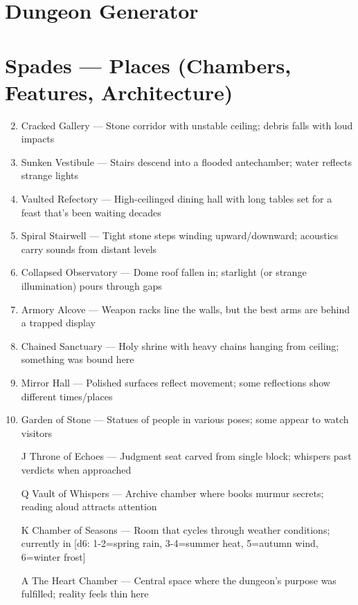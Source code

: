 \section{Dungeon Generator}
\label{chap:dungeon-generator}

\section*{Spades --- Places (Chambers, Features, Architecture)}
\label{sec:dungeon-places}
\begin{enumerate}
\setcounter{enumi}{1}
\item Cracked Gallery --- Stone corridor with unstable ceiling; debris falls with loud impacts
\item Sunken Vestibule --- Stairs descend into a flooded antechamber; water reflects strange lights
\item Vaulted Refectory --- High-ceilinged dining hall with long tables set for a feast that's been waiting decades
\item Spiral Stairwell --- Tight stone steps winding upward/downward; acoustics carry sounds from distant levels
\item Collapsed Observatory --- Dome roof fallen in; starlight (or strange illumination) pours through gaps
\item Armory Alcove --- Weapon racks line the walls, but the best arms are behind a trapped display
\item Chained Sanctuary --- Holy shrine with heavy chains hanging from ceiling; something was bound here
\item Mirror Hall --- Polished surfaces reflect movement; some reflections show different times/places
\item Garden of Stone --- Statues of people in various poses; some appear to watch visitors
\item[J] Throne of Echoes --- Judgment seat carved from single block; whispers past verdicts when approached
\item[Q] Vault of Whispers --- Archive chamber where books murmur secrets; reading aloud attracts attention
\item[K] Chamber of Seasons --- Room that cycles through weather conditions; currently in [d6: 1-2=spring rain, 3-4=summer heat, 5=autumn wind, 6=winter frost]
\item[A] The Heart Chamber --- Central space where the dungeon's purpose was fulfilled; reality feels thin here
\end{enumerate}

